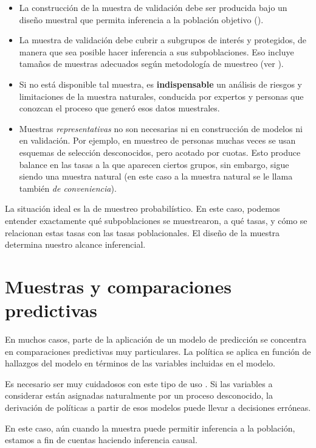 \documentclass[
]{book}
\providecommand{\tightlist}{%
  \setlength{\itemsep}{0pt}\setlength{\parskip}{0pt}}
\begin{document}
\begin{itemize}
\tightlist
\item
  La construcción de la muestra de validación debe ser producida bajo un diseño muestral que permita
  inferencia a la población objetivo (\citet{lohr}).
\item
  La muestra de validación debe cubrir a subgrupos de interés y protegidos, de manera que
  sea posible hacer inferencia a sus subpoblaciones. Eso incluye tamaños de muestras adecuados según
  metodología de muestreo (ver \citet{lohr}).
\item
  Si no está disponible tal muestra, es \textbf{indispensable} un análisis de riesgos y limitaciones de
  la muestra naturales, conducida por expertos y personas que conozcan el proceso
  que generó esos datos muestrales.
\item
  Muestras \emph{representativas} no son necesarias ni en construcción de modelos ni en validación. Por ejemplo,
  en muestreo de personas muchas veces se usan esquemas de selección desconocidos, pero acotado por cuotas. Esto
  produce balance en las tasas a la que aparecen ciertos grupos,
  sin embargo, sigue siendo una
  muestra natural (en este caso a la muestra natural se le llama también \emph{de conveniencia}).
\end{itemize}

La situación ideal es la de muestreo probabilístico.
En este caso, podemos entender exactamente qué
subpoblaciones se muestrearon, a qué tasas, y cómo se relacionan estas tasas con
las tasas poblacionales. El diseño de la muestra determina nuestro alcance inferencial.

\hypertarget{muestras-y-comparaciones-predictivas}{%
\section{Muestras y comparaciones predictivas}\label{muestras-y-comparaciones-predictivas}}

En muchos casos, parte de la aplicación de un modelo de predicción se concentra
en comparaciones predictivas muy particulares. La política se aplica en función
de hallazgos del modelo en términos de las variables incluidas en el modelo.

Es necesario ser muy cuidadosos con este tipo de uso \citep{king}. Si las variables a considerar
están asignadas naturalmente por un proceso desconocido, la derivación de políticas
a partir de esos modelos puede llevar a decisiones erróneas.

En este caso, aún cuando la muestra puede permitir inferencia a la población, estamos a fin
de cuentas haciendo inferencia causal.
\end{document}
